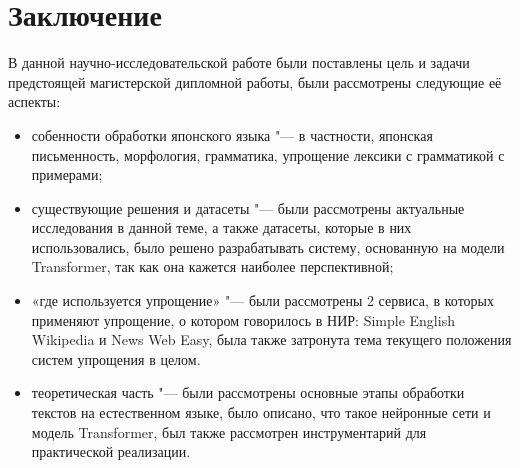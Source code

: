 \chapter*{Заключение} \label{ch-conclusion}

В данной научно-исследовательской работе были поставлены цель и задачи предстоящей магистерской дипломной работы, были рассмотрены следующие её аспекты:
\begin{itemize}%
  \item собенности обработки японского языка "--- в частности, японская письменность, морфология, грамматика, упрощение лексики с грамматикой с примерами;
  \item существующие решения и датасеты "--- были рассмотрены актуальные исследования в данной теме, а также датасеты, которые в них использовались, было решено разрабатывать систему, основанную на модели Transformer, так как она кажется наиболее перспективной;
  \item «где используется упрощение» "--- были рассмотрены 2 сервиса, в которых применяют упрощение, о котором говорилось в НИР: Simple English Wikipedia и News Web Easy, была также затронута тема текущего положения систем упрощения в целом.
  \item теоретическая часть "--- были рассмотрены основные этапы обработки текстов на естественном языке, было описано, что такое нейронные сети и модель Transformer, был также рассмотрен инструментарий для практической реализации.
\end{itemize}